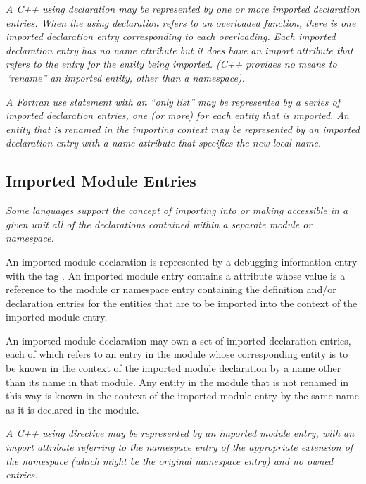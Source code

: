 \textit{A C++ using declaration may be represented by one or more
imported declaration entries.  When the using declaration
refers to an overloaded function, there is one imported
declaration entry corresponding to each overloading. Each
imported declaration entry has no name attribute but it does
have an import attribute that refers to the entry for the
entity being imported. (C++ provides no means to ``rename''
an imported entity, other than a namespace).
}

\textit{A Fortran use statement with an ``only list'' may be
represented by a series of imported declaration entries,
one (or more) for each entity that is imported. An entity
that is renamed in the importing context may be represented
by an imported declaration entry with a name attribute that
specifies the new local name.
}

\subsection{Imported Module Entries}
\label{chap:importedmoduleentries}

\textit{Some languages support the concept of importing into or making
accessible in a given unit all of the declarations contained
within a separate module or namespace.
}

An imported module declaration is represented by a debugging
information entry with the 
tag .
An
imported module entry contains a  attribute
whose value is a reference to the module or namespace entry
containing the definition and/or declaration entries for
the entities that are to be imported into the context of the
imported module entry.

An imported module declaration may own a set of imported
declaration entries, each of which refers to an entry in the
module whose corresponding entity is to be known in the context
of the imported module declaration by a name other than its
name in that module. Any entity in the module that is not
renamed in this way is known in the context of the imported
module entry by the same name as it is declared in the module.

\textit{A C++ using directive may be represented by an imported module
entry, with an import attribute referring to the namespace
entry of the appropriate extension of the namespace (which
might be the original namespace entry) and no owned entries.
}

